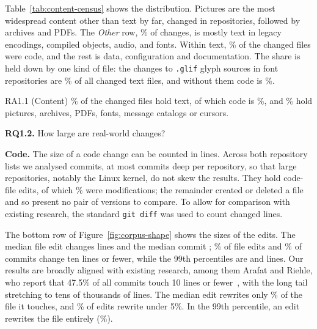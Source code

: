 \documentclass[sigconf,review]{acmart}
\begin{document}
Table~\ref{tab:content-census} shows the distribution. Pictures are the most widespread content other than text by far, changed in
\ContentCensusPicturesRepos{} repositories, followed by archives and PDFs. The \emph{Other} row,
\ContentCensusLeftPct{}\% of changes, is mostly text in legacy encodings, compiled objects, audio,
and fonts. Within text, \ChangeCensusCodeOfTextPct{}\% of the changed files were code, and the rest is data,
configuration and documentation. The share is held down by one kind of file: the
\ChangeCensusGlifChanges{} changes to \texttt{.glif} glyph sources in \ChangeCensusGlifRepos{} font
repositories are \ChangeCensusGlifOfTextPct{}\% of all changed text files, and without them code
is \ChangeCensusCodeOfTextNoGlifPct{}\%.

\begin{resultbox}{RA1.1 (Content)}
  \ContentCensusTextPct{}\% of the \ContentCensusChanges{} changed files hold text, of which code
  is \ChangeCensusCodeOfTextPct{}\%, and \ContentCensusFamiliesPct{}\% hold pictures, archives, PDFs, fonts, message
  catalogs or cursors.
\end{resultbox}

\textbf{RQ1.2.} How large are real-world changes?
\label{sec:edit-shape}

\textbf{Code.} The size of a code change can be counted in lines. Across both
repository lists we analysed \EditsCommits{} commits, at most \CorpusCloneDepth{} commits deep
per repository, so that large repositories, notably the Linux kernel, do not skew the results.
They hold \EditsCodeFileEdits{} code-file edits, of which \EditsModifiedSharePct{}\% were
modifications; the remainder created or deleted a file and so present no pair of versions to
compare. To allow for comparison with existing research, the standard \texttt{git diff} was used
to count changed lines.

The bottom row of Figure~\ref{fig:corpus-shape} shows the sizes of the edits. The median file
edit changes \EditsLinesPerFilePFifty{} lines and the median commit
\EditsLinesPerCommitPFifty{}; \EditsFileEditsUnderTenPct{}\% of file edits and
\EditsCommitsUnderTenPct{}\% of commits change ten lines or fewer, while the 99th percentiles are
\EditsLinesPerFilePNinetyNine{} and \EditsLinesPerCommitPNinetyNine{} lines. Our results are
broadly aligned with existing research, among them Arafat and Riehle, who report that 47.5\% of
all commits touch 10 lines or fewer~\cite{commit-size-distribution-paper}, with the long tail
stretching to tens of thousands of lines. The median edit rewrites only \EditsChurnPFiftyPct{}\%
of the file it touches, and \EditsChurnUnderFivePct{}\% of edits rewrite under 5\%. In the 99th
percentile, an edit rewrites the file entirely (\EditsChurnPNinetyNinePct{}\%).
\end{document}
